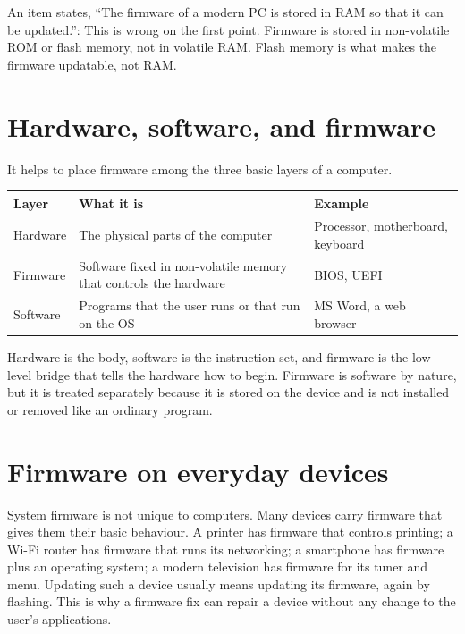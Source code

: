 \begin{example}
An item states, ``The firmware of a modern PC is stored in RAM so that it can
be updated.'': This is wrong on the first point. Firmware is stored in
non-volatile ROM or flash memory, not in volatile RAM. Flash memory is what
makes the firmware updatable, not RAM.
\end{example}

\section{Hardware, software, and firmware}
It helps to place firmware among the three basic layers of a computer.

\begin{center}
\begin{tabular}{p{}p{}p{}}
\toprule
\textbf{Layer} & \textbf{What it is} & \textbf{Example} \\
\midrule
Hardware & The physical parts of the computer & Processor, motherboard, keyboard \\
Firmware & Software fixed in non-volatile memory that controls the hardware & BIOS, UEFI \\
Software & Programs that the user runs or that run on the OS & MS Word, a web browser \\
\bottomrule
\end{tabular}
\end{center}

Hardware is the body, software is the instruction set, and firmware is the
low-level bridge that tells the hardware how to begin. Firmware is software
by nature, but it is treated separately because it is stored on the device
and is not installed or removed like an ordinary program.

\section{Firmware on everyday devices}
System firmware is not unique to computers. Many devices carry firmware that
gives them their basic behaviour. A printer has firmware that controls
printing; a Wi-Fi router has firmware that runs its networking; a smartphone
has firmware plus an operating system; a modern television has firmware for
its tuner and menu. Updating such a device usually means updating its
firmware, again by flashing. This is why a firmware fix can repair a device
without any change to the user's applications.

